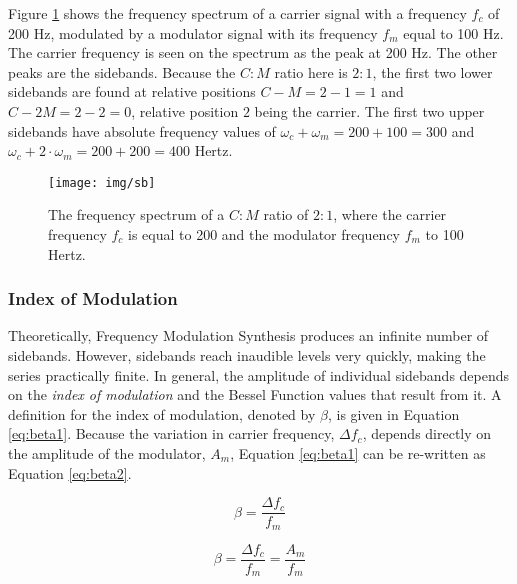 Figure \ref{fig:sb} shows the frequency spectrum of a carrier signal with a frequency $f_{c}$ of 200 Hz, modulated by a modulator signal with its frequency $f_{m}$ equal to 100 Hz. The carrier frequency is seen on the spectrum as the peak at 200 Hz. The other peaks are the sidebands. Because the $C:M$ ratio here is $2:1$, the first two lower sidebands are found at relative positions $C-M=2-1=1$ and $C-2M=2-2=0$, relative position $2$ being the carrier. The first two upper sidebands have absolute frequency values of $\omega_{c} + \omega_{m} = 200 + 100 = 300$ and %
  $\omega_{c} +2\cdot\omega_{m} = 200 + 200 = 400$ Hertz.\\

\begin{figure}[]
    \texttt{[image: img/sb]}
    \caption{The frequency spectrum of a $C:M$ ratio of $2:1$, where the carrier frequency $f_{c}$ is equal to 200 and the modulator frequency $f_{m}$ to 100 Hertz.}
    \label{fig:sb}
\end{figure}

\pagebreak

\subsubsection{Index of Modulation}

Theoretically, Frequency Modulation Synthesis produces an infinite number of sidebands. However, sidebands reach inaudible levels very quickly, making the series practically finite. In general, the amplitude of individual sidebands depends on the \emph{index of modulation} and the Bessel Function values that result from it. A definition for the index of modulation, denoted by $\beta$, is given in Equation \ref{eq:beta1}. Because the variation in carrier frequency, $\Delta f_{c}$, depends directly on the amplitude of the modulator, $A_{m}$, Equation \ref{eq:beta1} can be re-written as Equation \ref{eq:beta2}.

  \begin{multicols}{2}

    \begin{equation}
      \beta = \frac{\Delta f_{c}}{f_{m}}
      \label{eq:beta1}
    \end{equation}

    \begin{equation}
      \beta = \frac{\Delta f_{c}}{f_{m}} = \frac{A_{m}}{f_{m}}
      \label{eq:beta2}
    \end{equation}

  \end{multicols}

